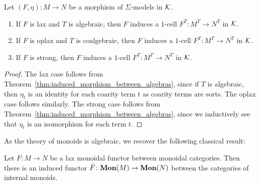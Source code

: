 \begin{corollary}
   Let $(F,\eta) \colon M \to N$ be a morphism of $\Sigma$-models in $\mathcal{K}$.
   \begin{enumerate}
       \item If $F$ is lax and $T$ is algebraic, then $F$ induces a $1$-cell $F^T \colon M^T \to N^T$ in $\mathcal{K}$.
       \item If $F$ is oplax and $T$ is coalgebraic, then $F$ induces a $1$-cell $F^T \colon M^T \to N^T$ in $\mathcal{K}$.
       \item If $F$ is strong, then $F$ induces a $1$-cell $F^T \colon M^T \to N^T$ in $\mathcal{K}$.
   \end{enumerate}
\end{corollary}
\begin{proof}
The lax case follows from Theorem~\ref{thm:induced_morphism_between_algebras}, since if $T$ is algebraic, then $\eta_t$ is an identity for each coarity term $t$ as coarity terms are sorts. The oplax case follows similarly. The strong case follows from Theorem~\ref{thm:induced_morphism_between_algebras}, since we inductively see that $\eta_t$ is an isomorphism for each term $t$.
\end{proof}

As the theory of monoids is algebraic, we recover the following classical result:
\begin{corollary}
   Let $F\colon M\to N$ be a lax monoidal functor between monoidal categories. Then there is an induced functor $\bar{F}\colon \mathbf{Mon}(M)\to \mathbf{Mon}(N)$ between the categories of internal monoids.
\end{corollary}
